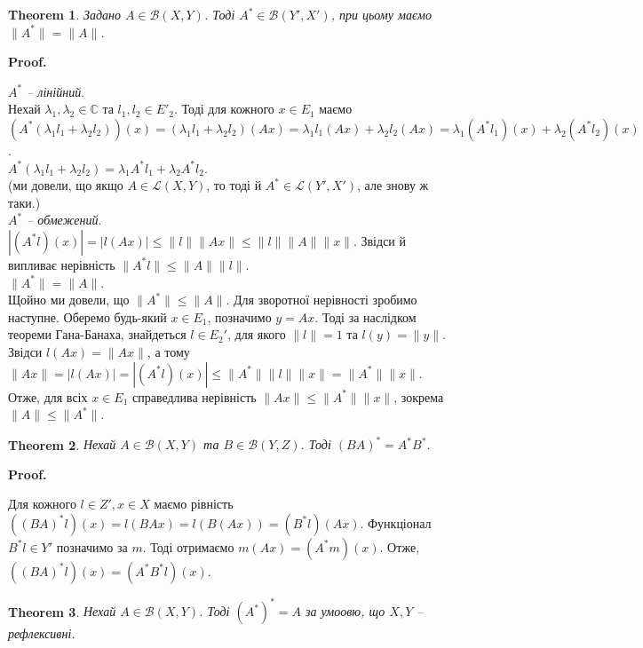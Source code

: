 \documentclass[a4paper, 10pt]{article}
\makeatletter
\theoremstyle{theoremdd}
\newtheorem{theorem}{Theorem}[subsection]
\theoremstyle{theoremdd}
\theoremstyle{theoremdd}
\theoremstyle{theoremdd}
\theoremstyle{theoremdd}
\theoremstyle{theoremdd}
\theoremstyle{theoremdd}
\theoremstyle{theoremdd}
\renewenvironment{proof}[1][Proof.\\]{\par
\pushQED{\hfill \qed}%
\normalfont \topsep6\p@\@plus6\p@\relax
\trivlist
\item\relax
{\bfseries
#1\@addpunct{.}}\hspace\labelsep\ignorespaces
}{%
\popQED\endtrivlist\@endpefalse
}
\makeatother
\begin{document}
\begin{theorem}
Задано $A \in \mathcal{B}(X,Y)$. Тоді $A^* \in \mathcal{B}(Y',X')$, при цьому маємо $\|A^*\| = \|A\|$.
\end{theorem}

\begin{proof}
\textit{$A^*$ -- лінійний}.\\
Нехай $\lambda_1,\lambda_2 \in \mathbb{C}$ та $l_1,l_2 \in E'_2$. Тоді для кожного $x \in E_1$ маємо\\
$(A^*(\lambda_1 l_1 + \lambda_2 l_2))(x) = (\lambda_1 l_1 + \lambda_2 l_2)(Ax) = \lambda_1 l_1 (Ax) + \lambda_2 l_2 (Ax) = \lambda_1 (A^*l_1)(x) + \lambda_2 (A^*l_2)(x)$.\\
$A^*(\lambda_1 l_1 + \lambda_2 l_2) = \lambda_1 A^* l_1 + \lambda_2 A^* l_2$.\\
(ми довели, що якщо $A \in \mathcal{L}(X,Y)$, то тоді й $A^* \in \mathcal{L}(Y',X')$, але знову ж таки.)
\bigskip \\
\textit{$A^*$ -- обмежений}.\\
$|(A^*l)(x)| = |l(Ax)| \leq \|l\| \|Ax\| \leq \|l\| \|A\| \|x\|$. Звідси й випливає нерівність $\|A^*l\| \leq \|A\| \|l\|$.
\bigskip \\
\textit{$\|A^*\| = \|A\|$}.\\
Щойно ми довели, що $\|A^*\| \leq \|A\|$. Для зворотної нерівності зробимо наступне. Оберемо будь-який $x \in E_1$, позначимо $y = Ax$. Тоді за наслідком теореми Гана-Банаха, знайдеться $l \in E_2'$, для якого $\|l\| = 1$ та $l(y) = \|y\|$. Звідси $l(Ax) = \|Ax\|$, а тому $\|Ax\| = |l(Ax)| = |(A^*l)(x)| \leq \|A^*\| \|l\| \|x\| = \|A^*\| \|x\|$. Отже, для всіх $x \in E_1$ справедлива нерівність $\|Ax\| \leq \|A^*\| \|x\|$, зокрема $\|A\| \leq \|A^*\|$.
\end{proof}

\begin{theorem}
Нехай $A \in \mathcal{B}(X,Y)$ та $B \in \mathcal{B}(Y,Z)$. Тоді $(BA)^* = A^*B^*$.
\end{theorem}

\begin{proof}
Для кожного $l \in Z',x \in X$ маємо рівність $((BA)^*l)(x) = l(BAx) = l(B(Ax)) = (B^*l)(Ax)$. Функціонал $B^*l \in Y'$ позначимо за $m$. Тоді отримаємо $m(Ax) = (A^*m)(x)$. Отже, \\ $((BA)^*l)(x) = (A^*B^*l)(x)$.
\end{proof}

\begin{theorem}
Нехай $A \in \mathcal{B}(X,Y)$. Тоді $(A^*)^* = A$ за умоовю, що $X,Y$ -- рефлексивні.
\end{theorem}
\end{document}
